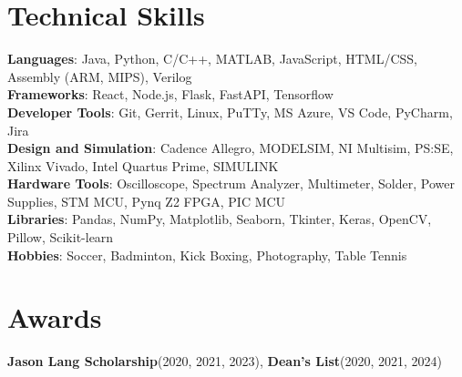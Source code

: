 \documentclass[A4,10pt]{article}
\newcommand{\resumeItem}[1]{
  \item\small{
    {#1 \vspace{-2pt}}
  }
}
\newcommand{\resumeItemListStart}{\begin{itemize}}
\newcommand{\resumeItemListEnd}{\end{itemize}\vspace{-5pt}}
\begin{document}
\section{Technical Skills}
 \begin{itemize}[leftmargin=0.15in, label={}]
    \small{\item{
     \textbf{Languages}{: Java, Python, C/C++, MATLAB, JavaScript, HTML/CSS, Assembly (ARM, MIPS), Verilog} \\
     \textbf{Frameworks}{: React, Node.js, Flask, FastAPI, Tensorflow} \\
     \textbf{Developer Tools}{: Git, Gerrit, Linux, PuTTy, MS Azure, VS Code, PyCharm, Jira} \\
     \textbf{Design and Simulation}{: Cadence Allegro, MODELSIM, NI Multisim, PS:SE, Xilinx Vivado, Intel Quartus Prime, SIMULINK}\\
     \textbf{Hardware Tools}{: Oscilloscope, Spectrum Analyzer, Multimeter, Solder, Power Supplies, STM MCU, Pynq Z2 FPGA, PIC MCU}\\
     \textbf{Libraries}{: Pandas, NumPy, Matplotlib, Seaborn, Tkinter, Keras, OpenCV, Pillow, Scikit-learn}\\
     \textbf{Hobbies}{: Soccer, Badminton, Kick Boxing, Photography, Table Tennis}
    }}
 \end{itemize}

\section{Awards}
 \begin{itemize}[leftmargin=0.15in, label={}]
  \small{\item{
   \textbf{Jason Lang Scholarship}{(2020, 2021, 2023),} \textbf{Dean's List}{(2020, 2021, 2024)}
  }}
\end{itemize}

\end{document}
